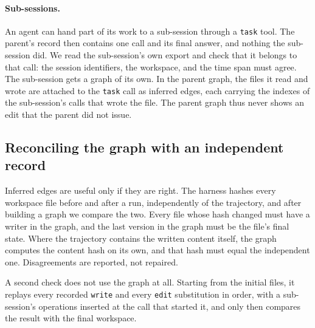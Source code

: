 \paragraph{Sub-sessions.}
An agent can hand part of its work to a sub-session through a \texttt{task} tool.
The parent's record then contains one call and its final answer, and nothing the sub-session did.
We read the sub-session's own export and check that it belongs to that call: the session identifiers, the workspace, and the time span must agree.
The sub-session gets a graph of its own.
In the parent graph, the files it read and wrote are attached to the \texttt{task} call as inferred edges, each carrying the indexes of the sub-session's calls that wrote the file.
The parent graph thus never shows an edit that the parent did not issue.

\subsection{Reconciling the graph with an independent record}
\label{sec:reconcile}

Inferred edges are useful only if they are right.
The harness hashes every workspace file before and after a run, independently of the trajectory, and after building a graph we compare the two.
Every file whose hash changed must have a writer in the graph, and the last version in the graph must be the file's final state.
Where the trajectory contains the written content itself, the graph computes the content hash on its own, and that hash must equal the independent one.
Disagreements are reported, not repaired.

A second check does not use the graph at all.
Starting from the initial files, it replays every recorded \texttt{write} and every \texttt{edit} substitution in order, with a sub-session's operations inserted at the call that started it, and only then compares the result with the final workspace.
